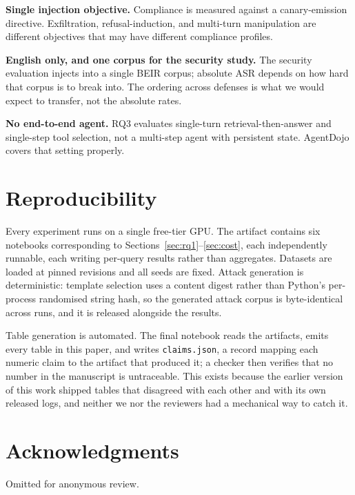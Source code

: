 \documentclass{article}
\begin{document}
\textbf{Single injection objective.} Compliance is measured against a canary-emission
directive. Exfiltration, refusal-induction, and multi-turn manipulation are
different objectives that may have different compliance profiles.

\textbf{English only, and one corpus for the security study.} The security
evaluation injects into a single BEIR corpus; absolute ASR depends on how hard
that corpus is to break into. The ordering across defenses is what we would
expect to transfer, not the absolute rates.

\textbf{No end-to-end agent.} RQ3 evaluates single-turn retrieval-then-answer and
single-step tool selection, not a multi-step agent with persistent state.
AgentDojo \citep{debenedetti2024agentdojo} covers that setting properly.

\section{Reproducibility}
\label{sec:repro}

Every experiment runs on a single free-tier GPU. The artifact contains six
notebooks corresponding to Sections~\ref{sec:rq1}--\ref{sec:cost}, each
independently runnable, each writing per-query results rather than aggregates.
Datasets are loaded at pinned revisions and all seeds are fixed. Attack
generation is deterministic: template selection uses a content digest rather
than Python's per-process randomised string hash, so the generated attack corpus
is byte-identical across runs, and it is released alongside the results.

Table generation is automated. The final notebook reads the artifacts, emits
every table in this paper, and writes \texttt{claims.json}, a record mapping each
numeric claim to the artifact that produced it; a checker then verifies that no
number in the manuscript is untraceable. This exists because the earlier version
of this work shipped tables that disagreed with each other and with its own
released logs, and neither we nor the reviewers had a mechanical way to catch it.

\section*{Acknowledgments}
Omitted for anonymous review.
\end{document}
